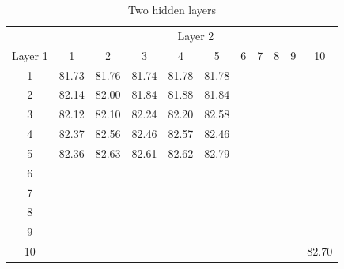 \documentclass[12pt]{article}
\begin{document}
      \begin{table}[H]
        \centering
        \caption{Two hidden layers}
        \begin{tabular}{c|cccccccccc}
          \toprule
                & \multicolumn{10}{c}{Layer 2} \\
          Layer 1 & \multicolumn{1}{c}{1} & \multicolumn{1}{c}{2} & \multicolumn{1}{c}{3} & \multicolumn{1}{c}{4} & \multicolumn{1}{c}{5} & \multicolumn{1}{c}{6} & \multicolumn{1}{c}{7} & \multicolumn{1}{c}{8} & \multicolumn{1}{c}{9} & \multicolumn{1}{c}{10} \\
          \midrule
          1     & \multicolumn{1}{c}{81.73} & \multicolumn{1}{c}{81.76} & \multicolumn{1}{c}{81.74} & \multicolumn{1}{c}{81.78} & \multicolumn{1}{c}{81.78} &       &       &       &       &  \\
          2     & \multicolumn{1}{c}{82.14} & \multicolumn{1}{c}{82.00} & \multicolumn{1}{c}{81.84} & \multicolumn{1}{c}{81.88} & \multicolumn{1}{c}{81.84} &       &       &       &       &  \\
          3     & \multicolumn{1}{c}{82.12} & \multicolumn{1}{c}{82.10} & \multicolumn{1}{c}{82.24} & \multicolumn{1}{c}{82.20} & \multicolumn{1}{c}{82.58} &       &       &       &       &  \\
          4     & \multicolumn{1}{c}{82.37} & \multicolumn{1}{c}{82.56} & \multicolumn{1}{c}{82.46} & \multicolumn{1}{c}{82.57} & \multicolumn{1}{c}{82.46} &       &       &       &       &  \\
          5     & \multicolumn{1}{c}{82.36} & \multicolumn{1}{c}{82.63} & \multicolumn{1}{c}{82.61} & \multicolumn{1}{c}{82.62} & \multicolumn{1}{c}{82.79} &       &       &       &       &  \\
          6     &       &       &       &       &       &       &       &       &       &  \\
          7     &       &       &       &       &       &       &       &       &       &  \\
          8     &       &       &       &       &       &       &       &       &       &  \\
          9     &       &       &       &       &       &       &       &       &       &  \\
          10    &       &       &       &       &       &       &       &       &       & 82.70 \\
          \bottomrule
        \end{tabular}
        \label{tab:ann-str-double}
      \end{table}
\end{document}

